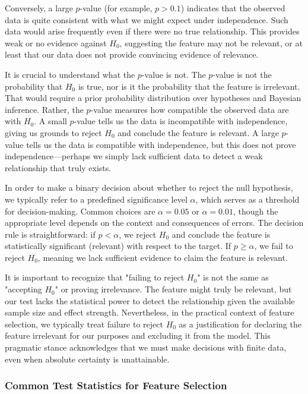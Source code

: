 Conversely, a large $p$-value (for example, $p > 0.1$) indicates that the observed data is quite consistent with what we might expect under independence. Such data would arise frequently even if there were no true relationship. This provides weak or no evidence against $H_0$, suggesting the feature may not be relevant, or at least that our data does not provide convincing evidence of relevance.

It is crucial to understand what the $p$-value is not. The $p$-value is not the probability that $H_0$ is true, nor is it the probability that the feature is irrelevant. That would require a prior probability distribution over hypotheses and Bayesian inference. Rather, the $p$-value measures how compatible the observed data are with $H_0$. A small $p$-value tells us the data is incompatible with independence, giving us grounds to reject $H_0$ and conclude the feature is relevant. A large $p$-value tells us the data is compatible with independence, but this does not prove independence—perhaps we simply lack sufficient data to detect a weak relationship that truly exists.

In order to make a binary decision about whether to reject the null hypothesis, we typically refer to a predefined significance level $\alpha$, which serves as a threshold for decision-making. Common choices are $\alpha = 0.05$ or $\alpha = 0.01$, though the appropriate level depends on the context and consequences of errors. The decision rule is straightforward: if $p < \alpha$, we reject $H_0$ and conclude the feature is statistically significant (relevant) with respect to the target. If $p \geq \alpha$, we fail to reject $H_0$, meaning we lack sufficient evidence to claim the feature is relevant.

It is important to recognize that "failing to reject $H_0$" is not the same as "accepting $H_0$" or proving irrelevance. The feature might truly be relevant, but our test lacks the statistical power to detect the relationship given the available sample size and effect strength. Nevertheless, in the practical context of feature selection, we typically treat failure to reject $H_0$ as a justification for declaring the feature irrelevant for our purposes and excluding it from the model. This pragmatic stance acknowledges that we must make decisions with finite data, even when absolute certainty is unattainable.

\subsubsection*{Common Test Statistics for Feature Selection}

